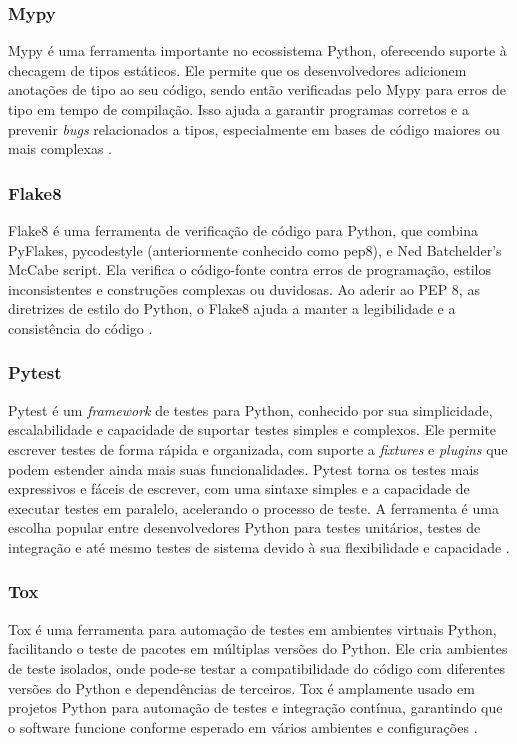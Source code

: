 \subsubsection{Mypy}
Mypy é uma ferramenta importante no ecossistema Python, oferecendo suporte à checagem de tipos estáticos.
Ele permite que os desenvolvedores adicionem anotações de tipo ao seu código, sendo então verificadas pelo Mypy para
erros de tipo em tempo de compilação.
Isso ajuda a garantir programas corretos e a prevenir \textit{bugs} relacionados a tipos, especialmente em bases de
código maiores ou mais complexas \cite{mypy}.

\subsubsection{Flake8}

Flake8 é uma ferramenta de verificação de código para Python, que combina PyFlakes, pycodestyle (anteriormente conhecido
como pep8), e Ned Batchelder’s McCabe script.
Ela verifica o código-fonte contra erros de programação, estilos inconsistentes e construções complexas ou duvidosas.
Ao aderir ao PEP 8, as diretrizes de estilo do Python, o Flake8 ajuda a manter a legibilidade e a consistência do
código \cite{flake8}.

\subsubsection{Pytest}

Pytest é um \textit{framework} de testes para Python, conhecido por sua simplicidade, escalabilidade e capacidade de
suportar testes simples e complexos.
Ele permite escrever testes de forma rápida e organizada, com suporte a \textit{fixtures} e \textit{plugins} que podem
estender ainda mais suas funcionalidades.
Pytest torna os testes mais expressivos e fáceis de escrever, com uma sintaxe simples e a capacidade de executar testes
em paralelo, acelerando o processo de teste.
A ferramenta é uma escolha popular entre desenvolvedores Python para testes unitários, testes de integração e até mesmo
testes de sistema devido à sua flexibilidade e capacidade \cite{pytest}.

\subsubsection{Tox}

Tox é uma ferramenta para automação de testes em ambientes virtuais Python, facilitando o teste de pacotes em múltiplas
versões do Python.
Ele cria ambientes de teste isolados, onde pode-se testar a compatibilidade do código com diferentes versões do Python
e dependências de terceiros.
Tox é amplamente usado em projetos Python para automação de testes e integração contínua, garantindo que o software
funcione conforme esperado em vários ambientes e configurações \cite{tox}.

